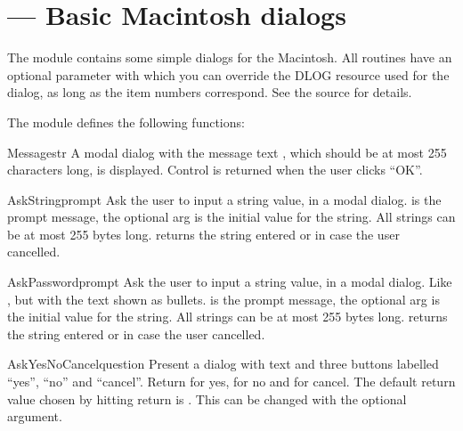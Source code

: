 \section{ ---
         Basic Macintosh dialogs}



The  module contains some simple dialogs for
the Macintosh.  All routines have an optional parameter  with
which you can override the DLOG resource used for the dialog, as long
as the item numbers correspond. See the source for details.

The  module defines the following functions:


\begin{funcdesc}{Message}{str}
A modal dialog with the message text , which should be at
most 255 characters long, is displayed. Control is returned when the
user clicks ``OK''.
\end{funcdesc}

\begin{funcdesc}{AskString}{prompt}
Ask the user to input a string value, in a modal dialog. 
is the prompt message, the optional  arg is the initial
value for the string. All strings can be at most 255 bytes
long.  returns the string entered or 
in case the user cancelled.
\end{funcdesc}

\begin{funcdesc}{AskPassword}{prompt}
Ask the user to input a string value, in a modal dialog. Like
, but with the text shown as bullets. 
is the prompt message, the optional  arg is the initial
value for the string. All strings can be at most 255 bytes
long.  returns the string entered or 
in case the user cancelled.
\end{funcdesc}

\begin{funcdesc}{AskYesNoCancel}{question}
Present a dialog with text  and three buttons labelled
``yes'', ``no'' and ``cancel''. Return  for yes,  for
no and  for cancel. The default return value chosen by
hitting return is . This can be changed with the optional
 argument.
\end{funcdesc}

